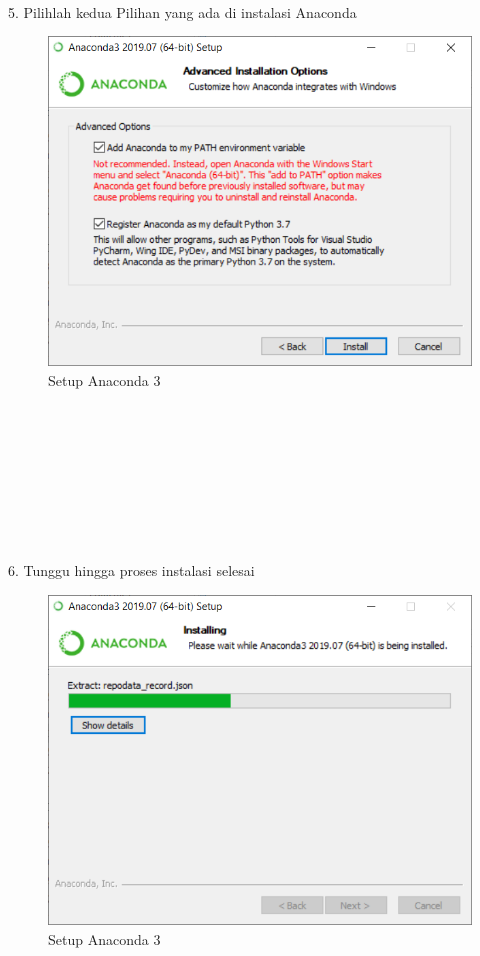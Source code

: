 \documentclass{article}
\begin{document}
\\
\\
\\
\\
\\
\\
\\
\\
5. Pilihlah kedua Pilihan yang ada di instalasi Anaconda\\
\begin{figure}[h]
	\centering
		\includegraphics[scale=0.5]{Gambar/A5.PNG}
		\caption{Setup Anaconda 3}
\end{figure}
\\
\\
\\
\\
\\
\\
\\
\\
6. Tunggu hingga proses instalasi selesai\\
\begin{figure}[h]
	\centering
		\includegraphics[scale=0.5]{Gambar/A6.PNG}
		\caption{Setup Anaconda 3}
\end{figure}
\end{document}
